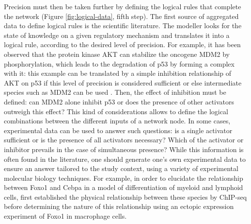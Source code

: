 \documentclass[a4paper,12pt,twoside,onecolumn,openright,final,oldfontcommands]{memoir}
\begin{document}
Precision must then be taken further by defining the logical rules that
complete the network (Figure \ref{fig:logical-data}, fifth step). The
first source of aggregated data to define logical rules is the
scientific literature. The modeller looks for the state of knowledge on
a given regulatory mechanism and translates it into a logical rule,
according to the desired level of precision. For example, it has been
observed that the protein kinase AKT can stabilize the oncogene MDM2 by
phosphorylation, which leads to the degradation of p53 by forming a
complex with it: this example can be translated by a simple inhibition
relationship of AKT on p53 if this level of precision is considered
sufficient or else intermediate species such as MDM2 can be used
\citep{cohen2015mathematical}. Then, the effect of inhibition must be
defined: can MDM2 alone inhibit p53 or does the presence of other
activators outweigh this effect? This kind of considerations allows to
define the logical combinations between the different inputs of a
network node. In some cases, experimental data can be used to answer
such questions: is a single activator sufficient or is the presence of
all activators necessary? Which of the activator or inhibitor prevails
in the case of simultaneous presence? While this information is often
found in the literature, one should generate one's own experimental data
to ensure an answer tailored to the study context, using a variety of
experimental molecular biology techniques. For example, in order to
elucidate the relationship between Foxo1 and Cebpa in a model of
differentiation of myeloid and lymphoid cells,
\citet{collombet2017logical} first established the physical relationship
between these species by ChIP-seq before determining the nature of this
relationship using an ectopic expression experiment of Foxo1 in
macrophage cells.
\end{document}
